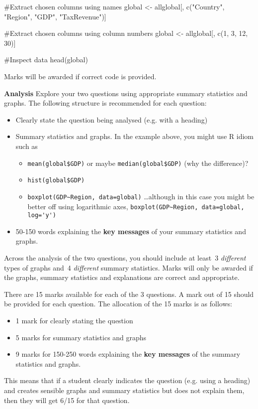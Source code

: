 \documentclass[11pt]{exam}
\newenvironment{codeChunk}{}{}
\begin{document}
\begin{questions}
\begin{codeChunk}
\begin{codeIn}
#Extract chosen columns using names
global <- allglobal[, c("Country", "Region", "GDP", "TaxRevenue")]

#Extract chosen columns using column numbers
global <- allglobal[, c(1, 3, 12, 30)]

#Inspect data
head(global)
\end{codeIn}
\end{codeChunk}

\begin{solution}[5mm]
Marks will be awarded if correct code is provided.  %
\end{solution}

\question[45] \textbf{Analysis} \droptotalpoints
Explore your two questions using appropriate summary statistics and graphs.
The following structure is recommended for each question:
\begin{itemize}
\item Clearly state the question being analysed (e.g. with a heading) %
\item Summary statistics and graphs.    In the example above, you might use R idiom such as

  \begin{itemize}
  \item  \verb+mean(global$GDP)+ or maybe \verb+median(global$GDP)+  (why the difference)?
  \item  \verb+hist(global$GDP)+
  \item \verb+boxplot(GDP~Region, data=global)+ \ldots although in this
    case you might be better off using logarithmic axes,
    \verb+boxplot(GDP~Region, data=global, log='y')+
  \end{itemize}
  

\item 50-150 words explaining the \textbf{key messages} of your summary statistics and graphs. %
\end{itemize}

Across the analysis of the two questions, you should include at
least~3 \textit{different} types of graphs and~4 \textit{different}
summary statistics.  Marks will only be awarded if the graphs, summary
statistics and explanations are correct and appropriate.

\begin{solution}[5mm]
There are 15 marks available for each of the 3 questions.  A mark out
of 15 should be provided for each question.  The allocation of the 15
marks is as follows:
\begin{itemize}
\item 1 mark for clearly stating the question
\item 5 marks for summary statistics and graphs
\item 9 marks for 150-250 words explaining the \textbf{key messages} of the summary statistics and graphs.
\end{itemize}
This means that if a student clearly indicates the question (e.g. using a heading) and creates sensible graphs and summary statistics but does not explain them, then they will get 6/15 for that question.


\end{solution}
\end{questions}
\end{document}
